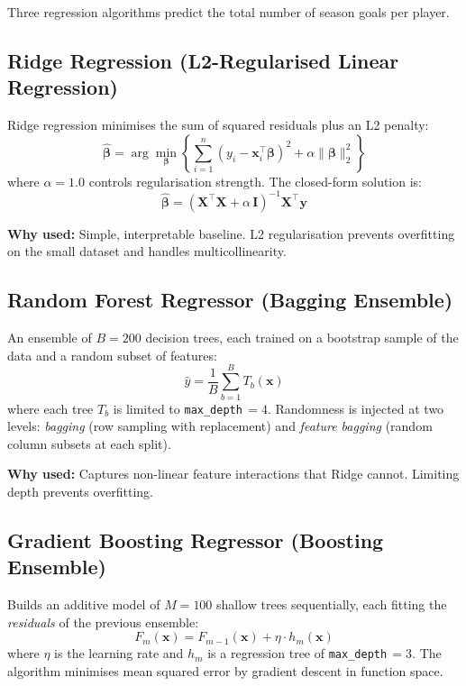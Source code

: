 \documentclass[11pt,a4paper]{article}
\begin{document}
Three regression algorithms predict the total number of season goals per
player.

\subsection{Ridge Regression (L2-Regularised Linear Regression)}

Ridge regression minimises the sum of squared residuals plus an L2 penalty:
\[
  \hat{\boldsymbol{\beta}} = \arg\min_{\boldsymbol{\beta}}
  \left\{
    \sum_{i=1}^{n}(y_i - \mathbf{x}_i^\top \boldsymbol{\beta})^2
    + \alpha \|\boldsymbol{\beta}\|_2^2
  \right\}
\]
where $\alpha = 1.0$ controls regularisation strength.  The closed-form
solution is:
\[
  \hat{\boldsymbol{\beta}} = (\mathbf{X}^\top\mathbf{X}
    + \alpha\,\mathbf{I})^{-1}\mathbf{X}^\top\mathbf{y}
\]

\textbf{Why used:} Simple, interpretable baseline.  L2 regularisation
prevents overfitting on the small dataset and handles multicollinearity.

\subsection{Random Forest Regressor (Bagging Ensemble)}

An ensemble of $B = 200$ decision trees, each trained on a bootstrap
sample of the data and a random subset of features:
\[
  \hat{y} = \frac{1}{B}\sum_{b=1}^{B} T_b(\mathbf{x})
\]
where each tree $T_b$ is limited to \texttt{max\_depth}$\,= 4$.
Randomness is injected at two levels: \emph{bagging} (row sampling with
replacement) and \emph{feature bagging} (random column subsets at each
split).

\textbf{Why used:} Captures non-linear feature interactions that Ridge
cannot.  Limiting depth prevents overfitting.

\subsection{Gradient Boosting Regressor (Boosting Ensemble)}

Builds an additive model of $M = 100$ shallow trees sequentially, each
fitting the \emph{residuals} of the previous ensemble:
\[
  F_m(\mathbf{x}) = F_{m-1}(\mathbf{x})
    + \eta \cdot h_m(\mathbf{x})
\]
where $\eta$ is the learning rate and $h_m$ is a regression tree of
\texttt{max\_depth}$\,= 3$.  The algorithm minimises mean squared error
by gradient descent in function space.
\end{document}
